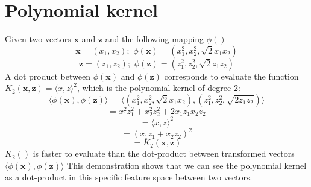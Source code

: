 \section{Polynomial kernel}
Given two vectors $\textbf{x}$ and $\textbf{z}$ and the following mapping $\phi()$
\[\textbf{x} = (x_{1}, x_{2}); \,\, \phi(\textbf{x}) = (x_{1}^{2}, x_{2}^{2}, \sqrt{2}x_{1}x_{2})\]
\[\textbf{z} = (z_{1}, z_{2}); \,\, \phi(\textbf{z}) = (z_{1}^{2}, z_{2}^{2}, \sqrt{2}z_{1}z_{2})\]
A dot product between $\phi(\textbf{x})$ and $\phi(\textbf{z})$ corresponds to evaluate the function $K_{2}(\textbf{x},\textbf{z}) = \langle x, z\rangle^{2}$, which is the polynomial kernel of degree 2:
\[\langle \phi(\textbf{x}), \phi(\textbf{z}) \rangle\ = \langle (x_{1}^{2}, x_{2}^{2}, \sqrt{2}x_{1}x_{2}), (z_{1}^{2}, z_{2}^{2}, \sqrt{2z_{1}z_{2}})\rangle\]
\[= x_{1}^{2}z_{1}^{2} + x_{2}^{2}z_{2}^{2} + 2x_{1}z_{1}x_{2}z_{2}\]
\[= \langle x, z \rangle^{2}\]
\[= (x_{1}z_{1} + x_{2}z_{2})^{2}\]
\[= K_{2}(\textbf{x},\textbf{z})\]
$K_{2}()$ is faster to evaluate than the dot-product between transformed vectors $\langle \phi(\textbf{x}), \phi(\textbf{z}) \rangle $\newline\newline
This demonstration shows that we can see the polynomial kernel as a dot-product in this specific feature space between two vectors.

